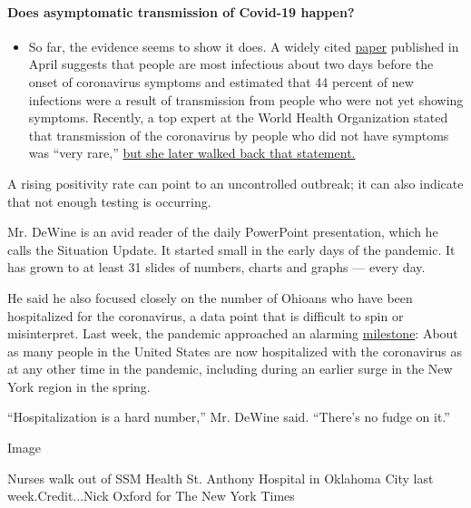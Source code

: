 \begin{itemize}
{  \paragraph{Does asymptomatic transmission of Covid-19
  happen?}\label{does-asymptomatic-transmission-of-covid-19-happen}}

  \begin{itemize}
  \tightlist
  \item
    So far, the evidence seems to show it does. A widely cited
    \href{https://www.nature.com/articles/s41591-020-0869-5}{paper}
    published in April suggests that people are most infectious about
    two days before the onset of coronavirus symptoms and estimated that
    44 percent of new infections were a result of transmission from
    people who were not yet showing symptoms. Recently, a top expert at
    the World Health Organization stated that transmission of the
    coronavirus by people who did not have symptoms was ``very rare,''
    \href{https://www.nytimes.com/2020/06/09/world/coronavirus-updates.html?action=click\&pgtype=Article\&state=default\&region=MAIN_CONTENT_3\&context=storylines_faq\#link-1f302e21}{but
    she later walked back that statement.}
  \end{itemize}
\end{itemize}

A rising positivity rate can point to an uncontrolled outbreak; it can
also indicate that not enough testing is occurring.

Mr. DeWine is an avid reader of the daily PowerPoint presentation, which
he calls the Situation Update. It started small in the early days of the
pandemic. It has grown to at least 31 slides of numbers, charts and
graphs --- every day.

He said he also focused closely on the number of Ohioans who have been
hospitalized for the coronavirus, a data point that is difficult to spin
or misinterpret. Last week, the pandemic approached an alarming
\href{https://www.nytimes.com/interactive/2020/07/23/us/coronavirus-hospitalizations-us.html}{milestone}:
About as many people in the United States are now hospitalized with the
coronavirus as at any other time in the pandemic, including during an
earlier surge in the New York region in the spring.

``Hospitalization is a hard number,'' Mr. DeWine said. ``There's no
fudge on it.''

Image

Nurses walk out of SSM Health St. Anthony Hospital in Oklahoma City last
week.Credit...Nick Oxford for The New York Times

